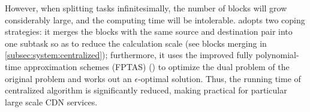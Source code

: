 However, when splitting tasks infinitesimally, the number of blocks will grow considerably large, and the computing time will be intolerable. \name adopts two coping strategies: it merges the blocks with the same source and destination pair into one subtask so as to reduce the calculation scale (see blocks merging in \Section\ref{subsec:system:centralized}); furthermore, it uses the improved fully polynomial-time approximation schemes (FPTAS) (\cite{fleischer2000approximating}) to optimize the dual problem of the original problem and works out an $\epsilon$-optimal solution. Thus, the running time of centralized algorithm is significantly reduced, making \name practical for particular large scale CDN services.

